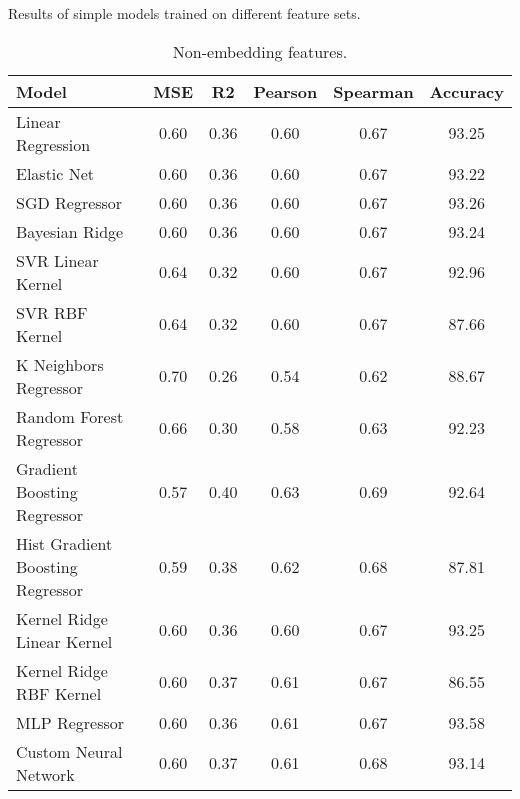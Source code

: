 \begin{table}[ht]
    \centering
    \caption{Results of simple models trained on different feature sets.}
    \label{tab:simple_models_results}

    \begin{subtable}[t]{\textwidth}
        \centering
        \begin{tabular}{|l|c|c|c|c|c|}
            \hline
            Model & MSE & R2 & Pearson & Spearman & Accuracy \\
            \hline
            Linear Regression & 0.60 & 0.36 & 0.60 & 0.67 & 93.25 \\
            Elastic Net & 0.60 & 0.36 & 0.60 & 0.67 & 93.22 \\
            SGD Regressor & 0.60 & 0.36 & 0.60 & 0.67 & 93.26 \\
            Bayesian Ridge & 0.60 & 0.36 & 0.60 & 0.67 & 93.24 \\
            SVR Linear Kernel & 0.64 & 0.32 & 0.60 & 0.67 & 92.96 \\
            SVR RBF Kernel & 0.64 & 0.32 & 0.60 & 0.67 & 87.66 \\
            K Neighbors Regressor & 0.70 & 0.26 & 0.54 & 0.62 & 88.67 \\
            Random Forest Regressor & 0.66 & 0.30 & 0.58 & 0.63 & 92.23 \\
            Gradient Boosting Regressor & 0.57 & 0.40 & 0.63 & 0.69 & 92.64 \\
            Hist Gradient Boosting Regressor & 0.59 & 0.38 & 0.62 & 0.68 & 87.81 \\
            Kernel Ridge Linear Kernel & 0.60 & 0.36 & 0.60 & 0.67 & 93.25 \\
            Kernel Ridge RBF Kernel & 0.60 & 0.37 & 0.61 & 0.67 & 86.55 \\
            MLP Regressor & 0.60 & 0.36 & 0.61 & 0.67 & 93.58 \\
            Custom Neural Network & 0.60 & 0.37 & 0.61 & 0.68 & 93.14 \\
            \hline
        \end{tabular}
        \caption{Non-embedding features.}
        \label{tab:simple_models_results_no_embeddings}
    \end{subtable}    


\end{table}
